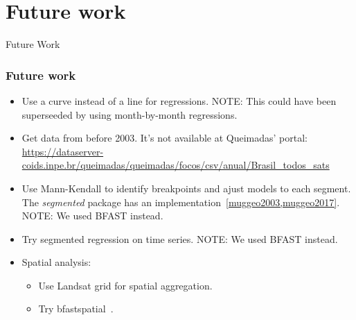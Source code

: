 \section{Future work}

\begin{frame}
  Future Work
\end{frame}

\begin{frame}
  \frametitle{Future work}
  \begin{itemize}
    \item Use a curve instead of a line for regressions. NOTE: This could have
      been superseeded by using month-by-month regressions.
    \item Get data from before 2003. It's not available at Queimadas' portal:
\url{https://dataserver-coids.inpe.br/queimadas/queimadas/focos/csv/anual/Brasil_todos_sats}
      \item Use Mann-Kendall to identify breakpoints and ajust models to each
        segment. The \textit{segmented} package has an 
        implementation~\ref{muggeo2003,muggeo2017}. NOTE: We used BFAST
        instead.
      \item Try segmented regression on time series. NOTE: We used BFAST
        instead.
  \item Spatial analysis:
    \begin{itemize}
      \item Use Landsat grid for spatial aggregation.
      \item Try bfastspatial~\cite{bfastspatial}.
    \end{itemize}
  \end{itemize}
\end{frame}
